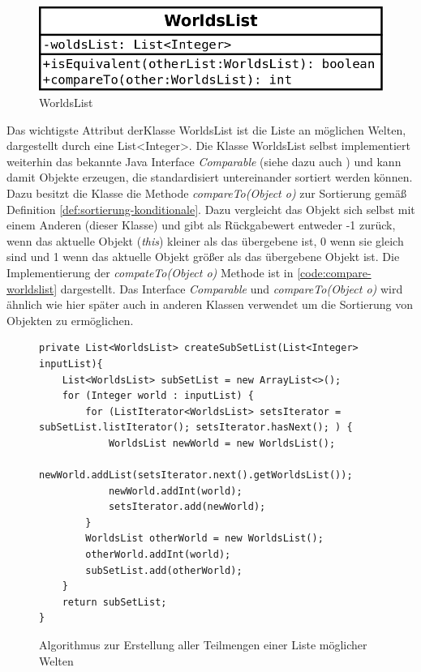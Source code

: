 \documentclass[12pt,a4paper]{article}
\begin{document}
\begin{figure}
\includegraphics[width=0.45\linewidth]{bilder/worldslist.png}
\caption{WorldsList}
\label{pic:worldslist}
\end{figure}


Das wichtigste Attribut derKlasse WorldsList ist die Liste an möglichen Welten, dargestellt durch eine List<Integer>. Die Klasse WorldsList selbst implementiert weiterhin das bekannte Java Interface  \textit{Comparable} (siehe dazu auch \cite{oracle2019}) und kann damit Objekte erzeugen, die standardisiert untereinander sortiert werden können. Dazu besitzt die Klasse die Methode \textit{compareTo(Object o)} zur Sortierung gemäß Definition \ref{def:sortierung-konditionale}. Dazu vergleicht das Objekt sich selbst mit einem Anderen (dieser Klasse) und gibt als Rückgabewert entweder -1 zurück, wenn das aktuelle  Objekt (\textit{this}) kleiner als das übergebene ist, 0 wenn sie gleich sind und 1 wenn das aktuelle Objekt größer als das übergebene Objekt ist. Die Implementierung der \textit{compateTo(Object o)} Methode ist in \autoref{code:compare-worldslist} dargestellt. Das Interface  \textit{Comparable} und \textit{compareTo(Object o)} wird ähnlich wie hier später auch in anderen Klassen verwendet um die Sortierung von Objekten zu ermöglichen.



\begin{figure}
\begin{lstlisting}
private List<WorldsList> createSubSetList(List<Integer> inputList){
    List<WorldsList> subSetList = new ArrayList<>();
    for (Integer world : inputList) {
        for (ListIterator<WorldsList> setsIterator = subSetList.listIterator(); setsIterator.hasNext(); ) {
            WorldsList newWorld = new WorldsList();
            newWorld.addList(setsIterator.next().getWorldsList());
            newWorld.addInt(world);
            setsIterator.add(newWorld);
        }
        WorldsList otherWorld = new WorldsList();
        otherWorld.addInt(world);
        subSetList.add(otherWorld);
    }
    return subSetList;
}
\end{lstlisting}
\caption{Algorithmus zur Erstellung aller Teilmengen einer Liste möglicher Welten}
\label{code:subsets}
\end{figure}
\end{document}
